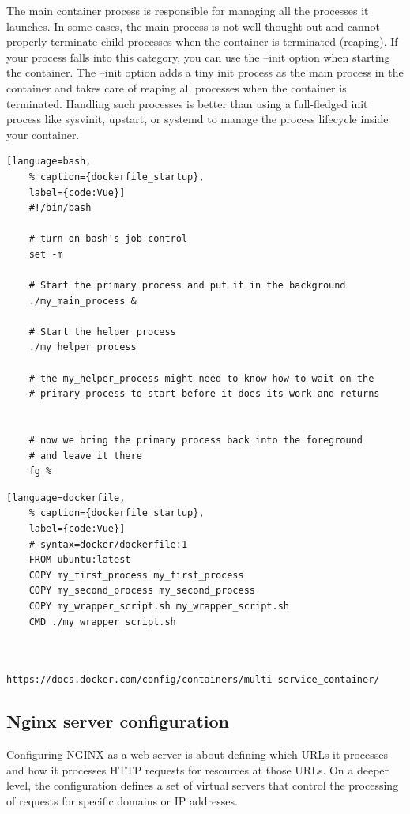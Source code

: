 The main container process is responsible for managing all the processes it launches. In some cases, the main process is not well thought out and cannot properly terminate child processes when the container is terminated (reaping). If your process falls into this category, you can use the --init option when starting the container. The --init option adds a tiny init process as the main process in the container and takes care of reaping all processes when the container is terminated. Handling such processes is better than using a full-fledged init process like sysvinit, upstart, or systemd to manage the process lifecycle inside your container.

\begin{lstlisting}[language=bash,
	% caption={dockerfile_startup}, 
	label={code:Vue}]
	#!/bin/bash
  
	# turn on bash's job control
	set -m
	
	# Start the primary process and put it in the background
	./my_main_process &
	
	# Start the helper process
	./my_helper_process
	
	# the my_helper_process might need to know how to wait on the
	# primary process to start before it does its work and returns
	
	
	# now we bring the primary process back into the foreground
	# and leave it there
	fg %
\end{lstlisting}

\begin{lstlisting}[language=dockerfile,
	% caption={dockerfile_startup}, 
	label={code:Vue}]
	# syntax=docker/dockerfile:1
	FROM ubuntu:latest
	COPY my_first_process my_first_process
	COPY my_second_process my_second_process
	COPY my_wrapper_script.sh my_wrapper_script.sh
	CMD ./my_wrapper_script.sh
	
	
\end{lstlisting}

\lstinline{https://docs.docker.com/config/containers/multi-service_container/}


\subsection{Nginx server configuration}
\label{Impl:NginxConfig}
Configuring NGINX as a web server is about defining which URLs it processes and how it processes HTTP requests for resources at those URLs. On a deeper level, the configuration defines a set of virtual servers that control the processing of requests for specific domains or IP addresses.


